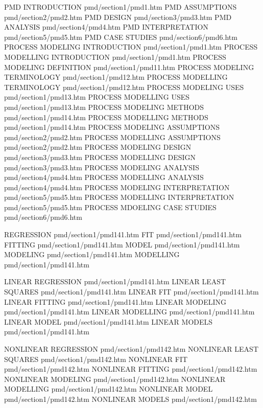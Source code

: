 PMD INTRODUCTION                        pmd/section1/pmd1.htm
PMD ASSUMPTIONS                         pmd/section2/pmd2.htm
PMD DESIGN                              pmd/section3/pmd3.htm
PMD ANALYSIS                            pmd/section4/pmd4.htm
PMD INTERPRETATION                      pmd/section5/pmd5.htm
PMD CASE STUDIES                        pmd/section6/pmd6.htm
PROCESS MODELING INTRODUCTION           pmd/section1/pmd1.htm
PROCESS MODELLING INTRODUCTION          pmd/section1/pmd1.htm
PROCESS MODELING DEFINITION             pmd/section1/pmd11.htm
PROCESS MODELING TERMINOLOGY            pmd/section1/pmd12.htm
PROCESS MODELLING TERMINOLOGY           pmd/section1/pmd12.htm
PROCESS MODELING USES                   pmd/section1/pmd13.htm
PROCESS MODELLING USES                  pmd/section1/pmd13.htm
PROCESS MODELING METHODS                pmd/section1/pmd14.htm
PROCESS MODELLING METHODS               pmd/section1/pmd14.htm
PROCESS MODELING ASSUMPTIONS            pmd/section2/pmd2.htm
PROCESS MODELLING ASSUMPTIONS           pmd/section2/pmd2.htm
PROCESS MODELING DESIGN                 pmd/section3/pmd3.htm
PROCESS MODELLING DESIGN                pmd/section3/pmd3.htm
PROCESS MODELING ANALYSIS               pmd/section4/pmd4.htm
PROCESS MODELLING ANALYSIS              pmd/section4/pmd4.htm
PROCESS MODELING INTERPRETATION         pmd/section5/pmd5.htm
PROCESS MODELLING INTERPRETATION        pmd/section5/pmd5.htm
PROCESS MDOELING CASE STUDIES           pmd/section6/pmd6.htm

REGRESSION                              pmd/section1/pmd141.htm
FIT                                     pmd/section1/pmd141.htm
FITTING                                 pmd/section1/pmd141.htm
MODEL                                   pmd/section1/pmd141.htm
MODELING                                pmd/section1/pmd141.htm
MODELLING                               pmd/section1/pmd141.htm

LINEAR REGRESSION                       pmd/section1/pmd141.htm
LINEAR LEAST SQUARES                    pmd/section1/pmd141.htm
LINEAR FIT                              pmd/section1/pmd141.htm
LINEAR FITTING                          pmd/section1/pmd141.htm
LINEAR MODELING                         pmd/section1/pmd141.htm
LINEAR MODELLING                        pmd/section1/pmd141.htm
LINEAR MODEL                            pmd/section1/pmd141.htm
LINEAR MODELS                           pmd/section1/pmd141.htm

NONLINEAR REGRESSION                    pmd/section1/pmd142.htm
NONLINEAR LEAST SQUARES                 pmd/section1/pmd142.htm
NONLINEAR FIT                           pmd/section1/pmd142.htm
NONLINEAR FITTING                       pmd/section1/pmd142.htm
NONLINEAR MODELING                      pmd/section1/pmd142.htm
NONLINEAR MODELLING                     pmd/section1/pmd142.htm
NONLINEAR MODEL                         pmd/section1/pmd142.htm
NONLINEAR MODELS                        pmd/section1/pmd142.htm


